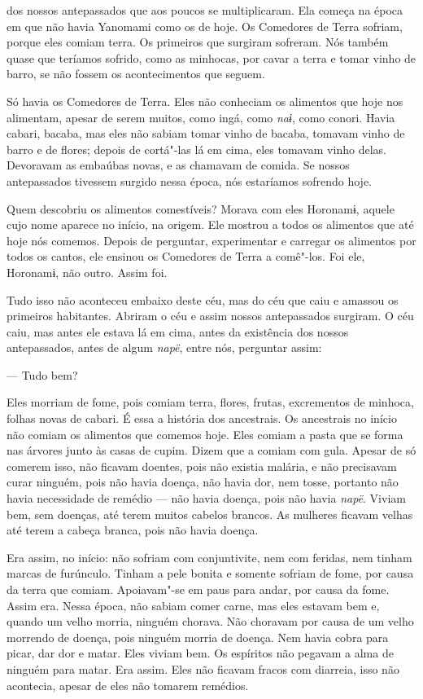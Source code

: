  

 

 dos nossos antepassados que aos poucos se
multiplicaram. Ela começa na época em que não havia Yanomami como os de
hoje. Os Comedores de Terra sofriam, porque eles comiam terra. Os
primeiros que surgiram sofreram. Nós também quase que teríamos sofrido,
como as minhocas, por cavar a terra e tomar vinho de barro, se não
fossem os acontecimentos que seguem. 

Só havia os Comedores de Terra. Eles não conheciam os alimentos que hoje
nos alimentam, apesar de serem muitos, como ingá, como \emph{naɨ},
como conori. Havia cabari, bacaba, mas eles não sabiam tomar vinho de
bacaba, tomavam vinho de barro e de flores; depois de cortá"-las lá em
cima, eles tomavam vinho delas. Devoravam as embaúbas novas, e as
chamavam de comida. Se nossos antepassados tivessem surgido nessa época,
nós estaríamos sofrendo hoje. 

Quem descobriu os alimentos comestíveis? Morava com eles Horonamɨ,
aquele cujo nome aparece no início, na origem. Ele mostrou a todos os
alimentos que até hoje nós comemos. Depois de perguntar, experimentar e
carregar os alimentos por todos os cantos, ele ensinou os Comedores de
Terra a comê"-los. Foi ele, Horonamɨ, não outro. Assim foi.

Tudo isso não aconteceu embaixo deste céu, mas do céu que caiu e amassou
os primeiros habitantes. Abriram o céu e assim nossos antepassados
surgiram. O céu caiu, mas antes ele estava lá em cima, antes da
existência dos nossos antepassados, antes de algum \emph{napë}, entre
nós, perguntar assim:

--- Tudo bem? 

 Eles morriam de fome, pois comiam terra, flores, frutas,
excrementos de minhoca, folhas novas de cabari. É essa a história dos
ancestrais. Os ancestrais no início não comiam os alimentos que comemos
hoje. Eles comiam a pasta que se forma nas árvores junto às casas de
cupim. Dizem que a comiam com gula. Apesar de só comerem isso, não
ficavam doentes, pois não existia malária, e não precisavam curar
ninguém, pois não havia doença, não havia dor, nem tosse, portanto não
havia necessidade de remédio --- não havia doença, pois não
havia \emph{napë}. Viviam bem, sem doenças, até terem muitos cabelos
brancos. As mulheres ficavam velhas até terem a cabeça branca, pois não
havia doença. 

Era assim, no início: não sofriam com conjuntivite, nem com feridas, nem
tinham marcas de furúnculo. Tinham a pele bonita e somente sofriam de
fome, por causa da terra que comiam. Apoiavam"-se em paus para andar, por
causa da fome. Assim era. Nessa época, não sabiam comer carne, mas eles
estavam bem e, quando um velho morria, ninguém chorava. Não choravam por
causa de um velho morrendo de doença, pois ninguém morria de doença. Nem
havia cobra para picar, dar dor e matar. Eles viviam bem. Os espíritos
não pegavam a alma de ninguém para matar. Era assim. Eles não ficavam
fracos com diarreia, isso não acontecia, apesar de eles não tomarem
remédios. 

